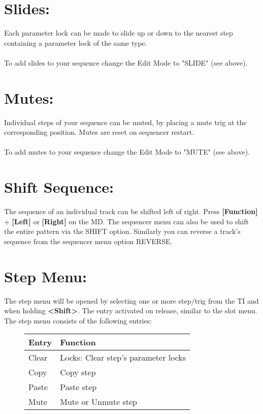 \section{Slides:}
Each parameter lock can be made to slide up or down to the nearest step containing a parameter lock of the same type.
\\\\
To add slides to your sequence change the Edit Mode to "SLIDE" (see above).
\section{Mutes:}
Individual steps of your sequence can be muted, by placing a mute trig at the corresponding position. Mutes are reset on sequencer restart.\\\\ 
To add mutes to your sequence change the Edit Mode to "MUTE" (see above).
\section{Shift Sequence:}
The sequence of an individual track can be shifted left of right. Press \textbf{[Function]} + \textbf{[Left]} or \textbf{[Right]} on the MD. The sequencer menu can also be used to shift the entire pattern via the SHIFT option.
Similarly you can reverse a track's sequence from the sequencer menu option REVERSE.
\section{Step Menu:}

The step menu will be opened by selecting one or more step/trig from the TI and when holding \textbf{<Shift>}. The entry activated on release, similar to the slot menu.
The step menu consists of the following entries:

\begin{figure}[hb]
    \begin{tabular}{|l|l|}
    \hline
    \rowcolor[HTML]{C0C0C0} 
    Entry            & Function \\ \hline
    Clear            & Locks: Clear step's parameter locks \\ \hline
    Copy         & Copy step\\ \hline
    Paste        & Paste step\\ \hline
    Mute         & Mute or Unmute step\\ \hline
    \end{tabular}
\end{figure}
